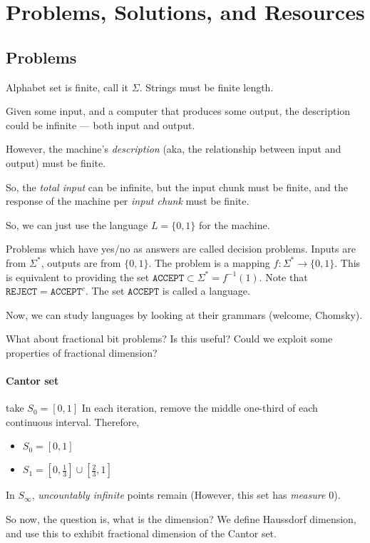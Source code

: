 \chapter{Problems, Solutions, and Resources}

\section{Problems}
Alphabet set is finite, call it $\Sigma$. Strings must be finite length.

Given some input, and a computer that produces some output, the description
could be infinite --- both input and output.

However, the machine's \textit{description} (aka, the relationship between
input and output) must be finite.

So, the \textit{total input} can be infinite, but the input chunk must be
finite, and the response of the machine per \textit{input chunk} must be finite.

So, we can just use the language $L= \{0, 1\}$ for the machine.

Problems which have yes/no as answers are called decision problems.
Inputs are from $\Sigma^{*}$, outputs are from $\{0, 1\}$. The problem is a
mapping $f: \Sigma^{*} \to \{0, 1\}$. This is equivalent to providing the set
$\texttt{ACCEPT} \subset \Sigma^{*} = f^{-1}(1)$. Note that $\texttt{REJECT} =
\texttt{ACCEPT}^c$. The set $\texttt{ACCEPT}$ is called a language.

Now, we can study languages by looking at their grammars (welcome, Chomsky).

What about fractional bit problems? Is this useful? Could we exploit some
properties of fractional dimension?

\subsubsection{Cantor set}
take $S_0 = [0, 1]$ In each iteration, remove the middle one-third of each
continuous interval. Therefore,
\begin{itemize}
\item $S_0 = [0, 1]$
\item $S_1 = [0, \frac{1}{3}] \cup [\frac{2}{3}, 1]$
\end{itemize}

In $S_\infty$, \textit{uncountably infinite} points remain (However, this
set has \textit{measure $0$}).

So now, the question is, what is the dimension? We define Haussdorf dimension, 
and use this to exhibit fractional dimension of the Cantor set.

